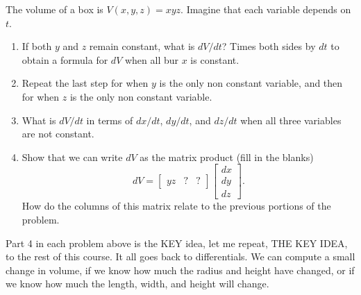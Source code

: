 \begin{problem}
 The volume of a box is $V(x,y,z)=xyz$. Imagine that each variable depends on $t$. 
\begin{enumerate}
 \item If both $y$ and $z$ remain constant, what is $dV/dt$? Times both sides by $dt$ to obtain a formula for $dV$ when all bur $x$ is constant.
 \item Repeat the last step for when $y$ is the only non constant variable, and then for when $z$ is the only non constant variable. 
 \item What is $dV/dt$ in terms of $dx/dt$, $dy/dt$, and $dz/dt$ when all three variables are not constant.
 \item%
% 
Show that we can write $dV$ as the matrix product (fill in the blanks) 
 $$dV = \begin{bmatrix}yz& ?&?\end{bmatrix}\begin{bmatrix}dx\\dy\\dz\end{bmatrix}.$$ 
 How do the columns of this matrix relate to the previous portions of the problem.
\end{enumerate}

\end{problem}

Part 4 in each problem above is the KEY idea, let me repeat, THE KEY IDEA, to the rest of this course. It all goes back to differentials. We can compute a small change in volume, if we know how much the radius and height have changed, or if we know how much the length, width, and height will change.  

